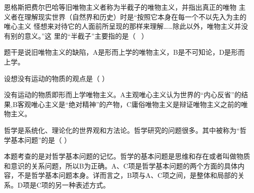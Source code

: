 \question 恩格斯把费尔巴哈等旧唯物主义者称为半截子的唯物主义，并指出真正的唯物
主义者在理解现实世界（自然界和历史）时是``按照它本身在每一个不以先入为主的唯心主义
怪想来对待它的人面前所呈现的那样来理解\ldots{}\ldots{}除此以外，唯物主义并没有别的意义。''这
里的``半截子''主要指的是（ ~）
\par{}
\begin{solution}题干是说旧唯物主义的缺陷，A是形而上学的唯物主义，B是不可知论，D是形而上学。
\end{solution}
\question 设想没有运动的物质的观点是（ ）
\par{}
\begin{solution}没有运动的物质即形而上学唯物主义。A主观唯心主义认为世界的``内心反省''的结果,B客观唯心主义是``绝对精神''的产物，C庸俗唯物主义是辩证唯物主义之前的唯物主义。
\end{solution}
\question 哲学是系统化、理论化的世界观和方法论。哲学研究的问题很多。其中被称为``哲学基本问题''的是（
）
\par{}
\begin{solution}本题考查的是对哲学基本问题的记忆。哲学的基本问题是思维和存在或者叫做物质和意识的关系问题，所以B为正确。A、C项是哲学基本问题的两个方面的具体内容，不是哲学基本问题本身。详而言之，B项与A、C项之间，是整体和局部的关系。D项是C项的另一种表述方式。
\end{solution}
